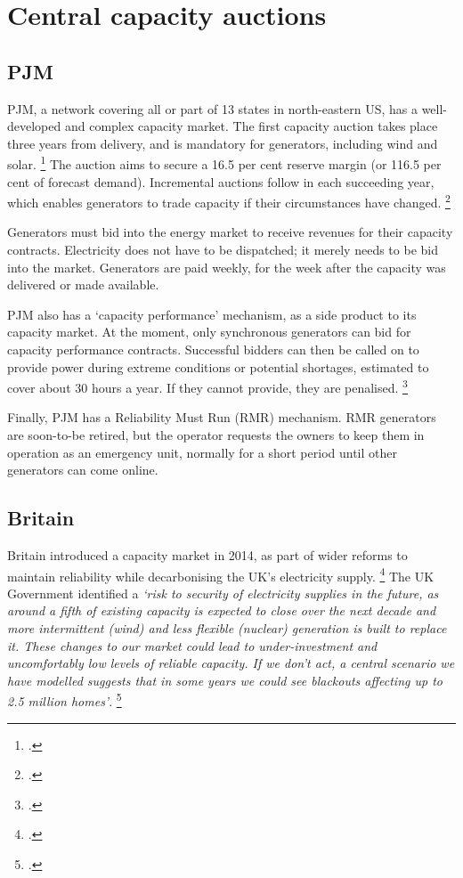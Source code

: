 \documentclass[FrontPage]{grattan}
\begin{document}
\section{Central capacity auctions}\label{sec:appendix-central-capacity-auctions} 

\subsection{PJM}\label{subsec:appendix-pjm} 
PJM, a network covering all or part of 13 states in north-eastern US, has a well-developed and complex capacity market. The first capacity auction takes place three years from delivery, and is mandatory for generators, including wind and solar.%
\footcite{PJM2016AuctionFAQs}
The auction aims to secure a 16.5 per cent reserve margin (or 116.5 per cent of forecast demand). Incremental auctions follow in each succeeding year, which enables generators to trade capacity if their circumstances have changed.%
\footcite{bowring2013capacity}

Generators must bid into the energy market to receive revenues for their capacity contracts. Electricity does not have to be dispatched; it merely needs to be bid into the market. Generators are paid weekly, for the week after the capacity was delivered or made available.

PJM also has a `capacity performance' mechanism, as a side product to its capacity market. At the moment, only synchronous generators can bid for capacity performance contracts. Successful bidders can then be called on to provide power during extreme conditions or potential shortages, estimated to cover about 30 hours a year. If they cannot provide, they are penalised.%
\footcite{Kolo2016PJMCapacityPerformance}

Finally, PJM has a Reliability Must Run (RMR) mechanism. RMR generators are soon-to-be retired, but the operator requests the owners to keep them in operation as an emergency unit, normally for a short period until other generators can come online. 

\subsection{Britain}\label{subsec:appendix-uk} 
Britain introduced a capacity market in 2014, as part of wider reforms to maintain reliability while decarbonising the UK's electricity supply.%
\footcite{Orme2016UKCapacityMarket}
The UK Government identified a \emph{`risk to security of electricity supplies in the future, as around a fifth of existing capacity is expected to close over the next decade and more intermittent (wind) and less flexible (nuclear) generation is built to replace it. These changes to our market could lead to under-investment and uncomfortably low levels of reliable capacity. If we don't act, a central scenario we have modelled suggests that in some years we could see blackouts affecting up to 2.5 million homes'}.%
\footcite{DECC2012EMRCapacityDesign}
\end{document}
